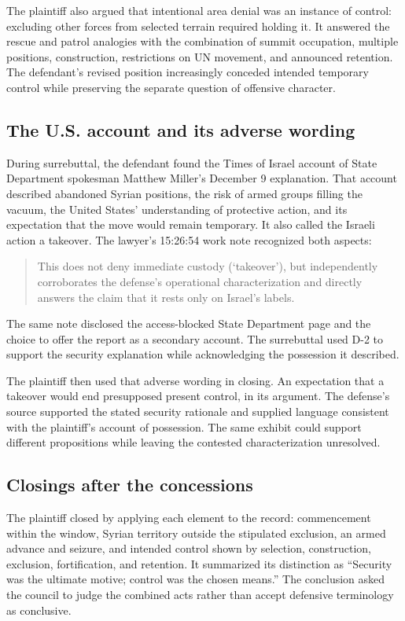 \documentclass[11pt]{article}
\begin{document}
The plaintiff also argued that intentional area denial was an instance of control: excluding other forces from selected terrain required holding it.  It answered the rescue and patrol analogies with the combination of summit occupation, multiple positions, construction, restrictions on UN movement, and announced retention.  The defendant's revised position increasingly conceded intended temporary control while preserving the separate question of offensive character.

\subsection{The U.S. account and its adverse wording}

During surrebuttal, the defendant found the Times of Israel account of State Department spokesman Matthew Miller's December 9 explanation.  That account described abandoned Syrian positions, the risk of armed groups filling the vacuum, the United States' understanding of protective action, and its expectation that the move would remain temporary.  It also called the Israeli action a takeover.  The lawyer's 15:26:54 work note recognized both aspects:
\begin{quote}
This does not deny immediate custody (`takeover'), but independently corroborates the defense's operational characterization and directly answers the claim that it rests only on Israel's labels.
\end{quote}
The same note disclosed the access-blocked State Department page and the choice to offer the report as a secondary account.  The surrebuttal used D-2 to support the security explanation while acknowledging the possession it described.

The plaintiff then used that adverse wording in closing.  An expectation that a takeover would end presupposed present control, in its argument.  The defense's source supported the stated security rationale and supplied language consistent with the plaintiff's account of possession.  The same exhibit could support different propositions while leaving the contested characterization unresolved.

\subsection{Closings after the concessions}

The plaintiff closed by applying each element to the record: commencement within the window, Syrian territory outside the stipulated exclusion, an armed advance and seizure, and intended control shown by selection, construction, exclusion, fortification, and retention.  It summarized its distinction as ``Security was the ultimate motive; control was the chosen means.''  The conclusion asked the council to judge the combined acts rather than accept defensive terminology as conclusive.
\end{document}
